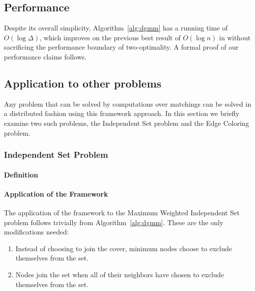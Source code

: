 \documentclass[article, 10pt, letter]{IEEEtran}
\begin{document}


\subsection{Performance}

\label{ssb:algorithms-dgmm-performance}

Despite its overall simplicity, Algorithm~\ref{alg:dgmm} has a running time of $O(\log \Delta)$, which improves on the previous best result of $O(\log n)$ in \cite{1582746} without sacrificing the performance boundary of two-optimality. A formal proof of our performance claims follows.



\subsection{Application to other problems}

Any problem that can be solved by computations over matchings can be solved in a distributed fashion using this framework approach. In this section we briefly examine two such problems, the Independent Set problem and the Edge Coloring problem.

\subsubsection{Independent Set Problem}
\paragraph{Definition}

\paragraph{Application of the Framework}

The application of the framework to the Maximum Weighted Independent Set problem follows trivially from Algorithm~\ref{alg:dgmm}. These are the only modifications needed:

\begin{enumerate}
\item Instead of choosing to join the cover, minimum nodes choose to exclude themselves from the set.
\item Nodes join the set when all of their neighbors have chosen to exclude themselves from the set.\label{en:modlist-lastline}
\end{enumerate}
\end{document}
